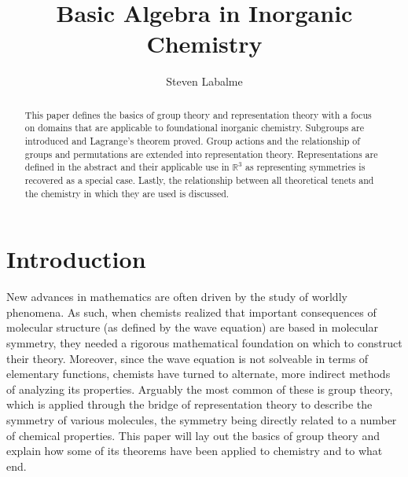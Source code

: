 \documentclass[openany, amssymb, psamsfonts]{amsart}
\title{Basic Algebra in Inorganic Chemistry}
\author{Steven Labalme}
\theoremstyle{definition}
\numberwithin{equation}{section}
\begin{document}
\begin{abstract}
    This paper defines the basics of group theory and representation theory with a focus on domains that are applicable to foundational inorganic chemistry. Subgroups are introduced and Lagrange's theorem proved. Group actions and the relationship of groups and permutations are extended into representation theory. Representations are defined in the abstract and their applicable use in $\mathbb{R}^3$ as representing symmetries is recovered as a special case. Lastly, the relationship between all theoretical tenets and the chemistry in which they are used is discussed.
\end{abstract}



\maketitle
\tableofcontents



\section{Introduction}
New advances in mathematics are often driven by the study of worldly phenomena. As such, when chemists realized that important consequences of molecular structure (as defined by the wave equation) are based in molecular symmetry, they needed a rigorous mathematical foundation on which to construct their theory. Moreover, since the wave equation is not solveable in terms of elementary functions, chemists have turned to alternate, more indirect methods of analyzing its properties. Arguably the most common of these is group theory, which is applied through the bridge of representation theory to describe the symmetry of various molecules, the symmetry being directly related to a number of chemical properties. This paper will lay out the basics of group theory and explain how some of its theorems have been applied to chemistry and to what end.
\end{document}
